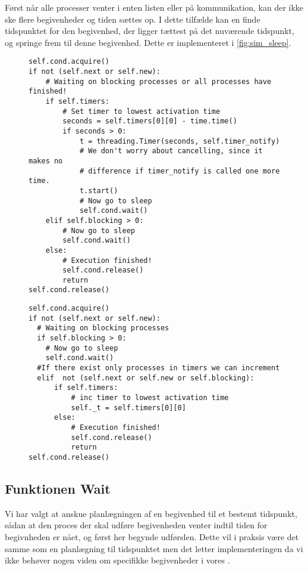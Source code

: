 Først når alle processer venter i enten  listen eller på kommunikation, kan der ikke ske flere begivenheder og tiden sættes op. 
I dette tilfælde  kan \sched en finde tidspunktet for den begivenhed, der ligger tættest på det nuværende tidspunkt,  og springe frem til denne begivenhed. Dette er implementeret i \cref{fig:sim_sleep}.
\begin{figure}[hbtp]
\begin{minipage}[c]{\linewidth}
\begin{lstlisting}[firstnumber=239, label=fig:blocking_sleep, caption=Uddrag af \sched en i \code{Scheduler}]
self.cond.acquire()
if not (self.next or self.new):
    # Waiting on blocking processes or all processes have finished!
    if self.timers:
        # Set timer to lowest activation time
        seconds = self.timers[0][0] - time.time()
        if seconds > 0:
            t = threading.Timer(seconds, self.timer_notify)
            # We don't worry about cancelling, since it makes no 
            # difference if timer_notify is called one more time.
            t.start()
            # Now go to sleep
            self.cond.wait()
    elif self.blocking > 0:
        # Now go to sleep
        self.cond.wait()
    else:
        # Execution finished!
        self.cond.release()
        return
self.cond.release()
\end{lstlisting}
\end{minipage}
\begin{minipage}[c]{\linewidth}
\begin{lstlisting}[firstnumber=158, label=fig:sim_sleep, caption= Uddrag af \sched en i \code{Simulation}]
self.cond.acquire()
if not (self.next or self.new):
  # Waiting on blocking processes
  if self.blocking > 0:
    # Now go to sleep
    self.cond.wait()
  #If there exist only processes in timers we can increment
  elif  not (self.next or self.new or self.blocking): 
      if self.timers:
          # inc timer to lowest activation time
          self._t = self.timers[0][0]
      else:
          # Execution finished!
          self.cond.release()
          return
self.cond.release()  
\end{lstlisting}
\end{minipage}
\end{figure}


\subsection{Funktionen Wait}\label{sec:Wait}
Vi har valgt at anskue planlægningen af en begivenhed til et bestemt tidspunkt, sådan at den proces der skal udføre begivenheden venter indtil tiden for begivnheden er nået, og først her begynde udførslen. Dette vil i praksis være det samme som en planlægning til tidspunktet men det letter implementeringen da vi ikke behøver nogen viden om specifikke begivenheder i vores \sched. 

